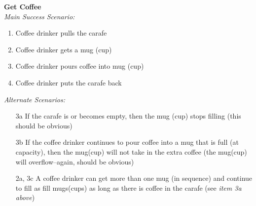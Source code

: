 \documentclass[letterpaper]{article}
\begin{document}
\noindent
\textbf{Get Coffee}\\
\textit{Main Success Scenario:  }
\begin{enumerate}
\item Coffee drinker pulls the carafe
\item Coffee drinker gets a mug (cup)
\item Coffee drinker pours coffee into mug (cup)
\item Coffee drinker puts the carafe back
\end{enumerate}
\textit{Alternate Scenarios:  }
\begin{enumerate}
\item[3a] If the carafe is or becomes empty, then the mug (cup) stops
filling (this should be obvious)
\item[3b] If the coffee drinker continues to pour coffee into a mug
that is full (at capacity), then the mug(cup) will not take in the
extra coffee (the mug(cup) will overflow--again, should be obvious)
\item[2a, 3c] A coffee drinker can get more than one mug (in sequence)
and continue to fill as fill mugs(cups) as long as there is coffee
in the carafe (see \textit{item 3a above})
\end{enumerate}
\end{document}

